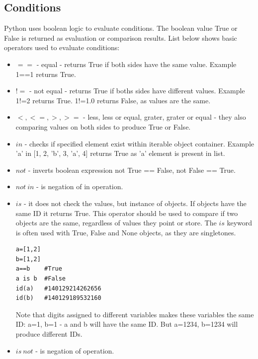 \documentclass{article}
\begin{document}
	\subsection{Conditions}
	Python uses boolean logic to evaluate conditions. The boolean value True or False is returned as evaluation or comparison results. List below shows basic operators used to evaluate conditions:
	\begin{itemize}
	\item $==$ - equal - returns True if both sides have the same value. Example 1==1 returns True.
	\item $!=$ - not equal - returns True if boths sides have different values. Example 1!=2 returns True. 1!=1.0 returns False, as values are the same.
	\item $<, <=, >, >=$ - less, less or equal, grater, grater or equal - they also comparing values on both sides to produce True or False.
	\item $in$ - checks if specified element exist within iterable object container. Example 'a' in [1, 2, 'b', 3, 'a', 4] returns True as 'a' element is present in list.
	\item $not$ - inverts boolean expression not True == False, not False == True.
	\item $not\ in$ - is negation of in operation.
	\item $is$ - it does not check the values, but instance of objects. If objects have the same ID it returns True. This operator should be used to compare if two objects are the same, regardless of values they point or store. The $is$ keyword is often used with True, False and None objects, as they are singletones.
	\begin{lstlisting}[style=pystyle]
a=[1,2]
b=[1,2]
a==b	#True
a is b	#False
id(a)	#140129214262656
id(b)	#140129189532160
	\end{lstlisting}
	Note that digits assigned to different variables makes these variables the same ID: a=1, b=1 - a and b will have the same ID. But a=1234, b=1234 will produce different IDs.
	\item $is\ not$ - is negation of operation. 
	\end{itemize}
\end{document}
